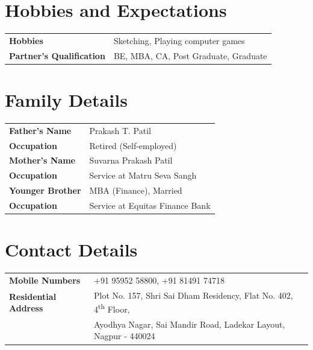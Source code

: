 \documentclass[10pt,a4paper,twocolumn]{article}
\begin{document}
\section*{Hobbies and Expectations}
\begin{tabularx}{\linewidth}{lX}
\textbf{Hobbies} & Sketching, Playing computer games \\
\textbf{Partner's Qualification} & BE, MBA, CA, Post Graduate, Graduate \\
\end{tabularx}

\section*{Family Details}
\begin{tabularx}{\linewidth}{lX}
\textbf{Father's Name} & Prakash T. Patil \\
\textbf{Occupation} & Retired (Self-employed) \\
\textbf{Mother's Name} & Suvarna Prakash Patil \\
\textbf{Occupation} & Service at Matru Seva Sangh \\
\textbf{Younger Brother} & MBA (Finance), Married \\
\textbf{Occupation} & Service at Equitas Finance Bank \\
\end{tabularx}

\section*{Contact Details}
\begin{tabularx}{\linewidth}{lX}
\textbf{Mobile Numbers} & +91 95952 58800, +91 81491 74718 \\
\textbf{Residential Address} &
Plot No. 157, Shri Sai Dham Residency, Flat No. 402, 4\textsuperscript{th} Floor,\\
& Ayodhya Nagar, Sai Mandir Road, Ladekar Layout, Nagpur - 440024 \\
\end{tabularx}
\end{document}
